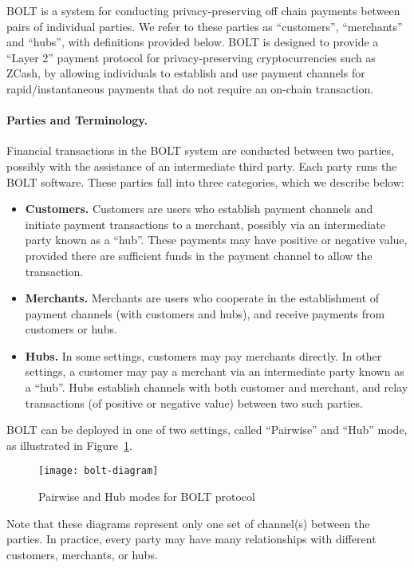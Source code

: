 \documentclass[10pt]{report}
\begin{document}
BOLT is a system for conducting privacy-preserving off chain payments between pairs of individual parties. We refer to these parties as ``customers'', ``merchants'' and ``hubs'', with definitions provided below. BOLT is designed to provide a ``Layer 2'' payment protocol for privacy-preserving cryptocurrencies such as ZCash, by allowing individuals to establish and use payment channels for rapid/instantaneous payments that do not require an on-chain transaction.

\paragraph{Parties and Terminology.} Financial transactions in the BOLT system are conducted between two parties, possibly with the assistance of an intermediate third party. Each party runs the BOLT software. These parties fall into three categories, which we describe below:
\begin{itemize}
\item {\bf Customers.} Customers are users who establish payment channels and initiate payment transactions to a merchant, possibly via an intermediate party known as a ``hub''. These payments may have positive or negative value, provided there are sufficient funds in the payment channel to allow the transaction.
\item {\bf Merchants.} Merchants are users who cooperate in the establishment of payment channels (with customers and hubs), and receive payments from customers or hubs.
\item {\bf Hubs.} In some settings, customers may pay merchants directly. In other settings, a customer may pay a merchant via an intermediate party known as a ``hub''. Hubs establish channels with both customer and merchant, and relay transactions (of positive or negative value) between two such parties.
\end{itemize} 

BOLT can be deployed in one of two settings, called ``Pairwise'' and ``Hub'' mode, as illustrated in Figure~\ref{fig:bolt}.

\begin{figure}
  \caption{Pairwise and Hub modes for BOLT protocol}
  \centering
    \texttt{[image: bolt-diagram]}
\label{fig:bolt}
\end{figure}

Note that these diagrams represent only one set of channel(s) between the parties. In practice, every party may have many relationships with different customers, merchants, or hubs.
\end{document}
